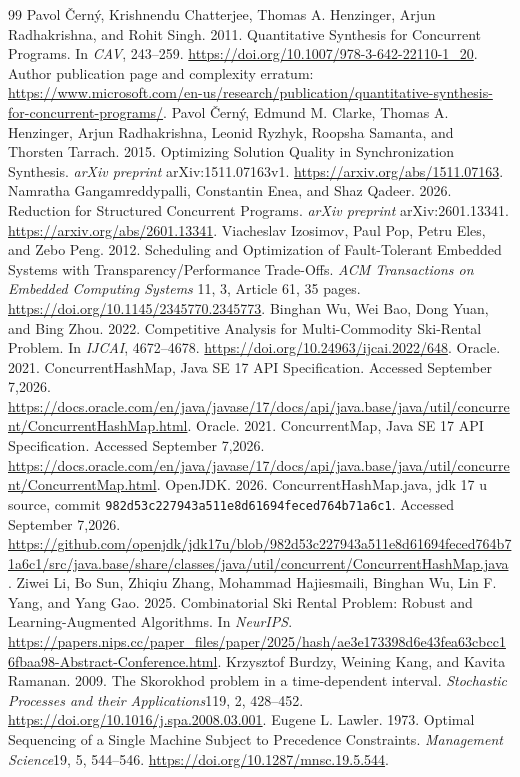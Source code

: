 \documentclass[acmsmall,screen,review,anonymous]{acmart}
\begin{document}
\begin{thebibliography}{99}
 Pavol \v{C}ern\'y, Krishnendu Chatterjee, Thomas A. Henzinger, Arjun Radhakrishna, and Rohit Singh. 2011. Quantitative Synthesis for Concurrent Programs. In \emph{CAV}, 243--259. \url{https://doi.org/10.1007/978-3-642-22110-1_20}. Author publication page and complexity erratum: \url{https://www.microsoft.com/en-us/research/publication/quantitative-synthesis-for-concurrent-programs/}.
 Pavol \v{C}ern\'y, Edmund M. Clarke, Thomas A. Henzinger, Arjun Radhakrishna, Leonid Ryzhyk, Roopsha Samanta, and Thorsten Tarrach. 2015. Optimizing Solution Quality in Synchronization Synthesis. \emph{arXiv preprint} arXiv:1511.07163v1. \url{https://arxiv.org/abs/1511.07163}.
 Namratha Gangamreddypalli, Constantin Enea, and Shaz Qadeer. 2026. Reduction for Structured Concurrent Programs. \emph{arXiv preprint} arXiv:2601.13341. \url{https://arxiv.org/abs/2601.13341}.
 Viacheslav Izosimov, Paul Pop, Petru Eles, and Zebo Peng. 2012. Scheduling and Optimization of Fault-Tolerant Embedded Systems with Transparency/Performance Trade-Offs. \emph{ACM Transactions on Embedded Computing Systems} 11, 3, Article 61, 35 pages. \url{https://doi.org/10.1145/2345770.2345773}.
 Binghan Wu, Wei Bao, Dong Yuan, and Bing Zhou. 2022. Competitive Analysis for Multi-Commodity Ski-Rental Problem. In \emph{IJCAI}, 4672--4678. \url{https://doi.org/10.24963/ijcai.2022/648}.
 Oracle. 2021. ConcurrentHashMap, Java SE 17 API Specification. Accessed September 7,2026. \url{https://docs.oracle.com/en/java/javase/17/docs/api/java.base/java/util/concurrent/ConcurrentHashMap.html}.
 Oracle. 2021. ConcurrentMap, Java SE 17 API Specification. Accessed September 7,2026. \url{https://docs.oracle.com/en/java/javase/17/docs/api/java.base/java/util/concurrent/ConcurrentMap.html}.
 OpenJDK. 2026. ConcurrentHashMap.java, jdk 17 u source, commit \texttt{982d53c227943a511e8d61694feced764b71a6c1}. Accessed September 7,2026. \url{https://github.com/openjdk/jdk17u/blob/982d53c227943a511e8d61694feced764b71a6c1/src/java.base/share/classes/java/util/concurrent/ConcurrentHashMap.java}.
 Ziwei Li, Bo Sun, Zhiqiu Zhang, Mohammad Hajiesmaili, Binghan Wu, Lin F. Yang, and Yang Gao. 2025. Combinatorial Ski Rental Problem: Robust and Learning-Augmented Algorithms. In \emph{NeurIPS}. \url{https://papers.nips.cc/paper_files/paper/2025/hash/ae3e173398d6e43fea63cbcc16fbaa98-Abstract-Conference.html}.
 Krzysztof Burdzy, Weining Kang, and Kavita Ramanan. 2009. The Skorokhod problem in a time-dependent interval. \emph{Stochastic Processes and their Applications}119, 2, 428--452. \url{https://doi.org/10.1016/j.spa.2008.03.001}.
 Eugene L. Lawler. 1973. Optimal Sequencing of a Single Machine Subject to Precedence Constraints. \emph{Management Science}19, 5, 544--546. \url{https://doi.org/10.1287/mnsc.19.5.544}.


\end{thebibliography}
\end{document}
